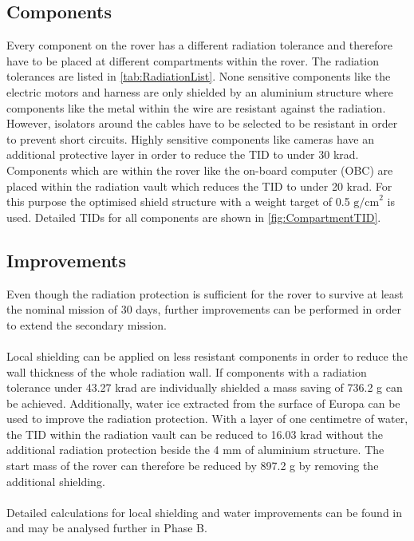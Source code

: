 \subsection{Components}

\label{subsec:RadiationComponents}

Every component on the rover has a different radiation tolerance and therefore have to be placed at different compartments within the rover. The radiation tolerances are listed in \autoref{tab:RadiationList}. None sensitive components like the electric motors and harness are only shielded by an aluminium structure where components like the metal within the wire are resistant against the radiation. However, isolators around the cables have to be selected to be resistant in order to prevent short circuits. Highly sensitive components like cameras have an additional protective layer in order to reduce the TID to under 30 krad. Components which are within the rover like the on-board computer (OBC) are placed within the radiation vault which reduces the TID to under 20 krad. For this purpose the optimised shield structure with a weight target of 0.5 \(\text{g/cm}^2\) is used. Detailed TIDs for all components are shown in \autoref{fig:CompartmentTID}.

\subsection{Improvements}

\label{subsec:RadiationImprovements}

Even though the radiation protection is sufficient for the rover to survive at least the nominal mission of 30 days, further improvements can be performed in order to extend the secondary mission. \\ \\
Local shielding can be applied on less resistant components in order to reduce the wall thickness of the whole radiation wall. If components with a radiation tolerance under 43.27 krad are individually shielded a mass saving of 736.2 g can be achieved. Additionally, water ice extracted from the surface of Europa can be used to improve the radiation protection. With a layer of one centimetre of water, the TID within the radiation vault can be reduced to 16.03 krad without the additional radiation protection beside the 4 mm of aluminium structure. The start mass of the rover can therefore be reduced by 897.2 g by removing the additional shielding. \\ \\
Detailed calculations for local shielding and water improvements can be found in  and may be analysed further in Phase B.

